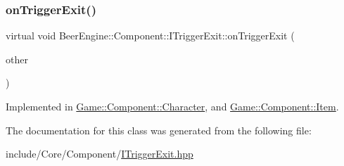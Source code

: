 \subsubsection{\texorpdfstring{on\+Trigger\+Exit()}{onTriggerExit()}}
{\footnotesize\ttfamily virtual void Beer\+Engine\+::\+Component\+::\+I\+Trigger\+Exit\+::on\+Trigger\+Exit (\begin{DoxyParamCaption}\item[{\mbox{\hyperlink{class_beer_engine_1_1_component_1_1_a_collider}{A\+Collider}} $\ast$}]{other }\end{DoxyParamCaption})\hspace{0.3cm}{\ttfamily [pure virtual]}}



Implemented in \mbox{\hyperlink{class_game_1_1_component_1_1_character_a1acc86ac5340ef65ba18d755f1ea37f9}{Game\+::\+Component\+::\+Character}}, and \mbox{\hyperlink{class_game_1_1_component_1_1_item_a33c72fb48b46ce7b67b924472d0f3456}{Game\+::\+Component\+::\+Item}}.



The documentation for this class was generated from the following file\+:\begin{DoxyCompactItemize}
\item 
include/\+Core/\+Component/\mbox{\hyperlink{_i_trigger_exit_8hpp}{I\+Trigger\+Exit.\+hpp}}\end{DoxyCompactItemize}
